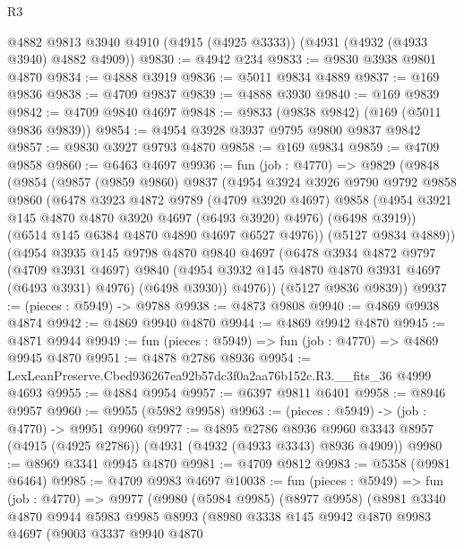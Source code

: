 \begin{lexlean}{R3}
\begin{coremodule}
    @4882
    @9813
    @3940
    @4910
    (@4915 (@4925 @3333))
    (@4931 (@4932 (@4933 @3940) @4882 @4909))
@9830 := @4942 @234
@9833 := @9830 @3938 @9801 @4870
@9834 := @4888 @3919
@9836 := @5011 @9834 @4889
@9837 := @169 @9836
@9838 := @4709 @9837
@9839 := @4888 @3930
@9840 := @169 @9839
@9842 := @4709 @9840 @4697
@9848 := @9833 (@9838 @9842) (@169 (@5011 @9836 @9839))
@9854 := @4954 @3928 @3937 @9795 @9800 @9837 @9842
@9857 := @9830 @3927 @9793 @4870
@9858 := @169 @9834
@9859 := @4709 @9858
@9860 := @6463 @4697
@9936 := fun (job : @4770) =>
  @9829
    (@9848
      (@9854
        (@9857
          (@9859 @9860)
          @9837
          (@4954
            @3924
            @3926
            @9790
            @9792
            @9858
            @9860
            (@6478
              @3923
              @4872
              @9789
              (@4709 @3920 @4697)
              @9858
              (@4954 @3921 @145 @4870 @4870 @3920 @4697 (@6493 @3920) @4976)
              (@6498 @3919))
            (@6514 @145 @6384 @4870 @4890 @4697 @6527 @4976))
          (@5127 @9834 @4889))
        (@4954
          @3935
          @145
          @9798
          @4870
          @9840
          @4697
          (@6478
            @3934
            @4872
            @9797
            (@4709 @3931 @4697)
            @9840
            (@4954 @3932 @145 @4870 @4870 @3931 @4697 (@6493 @3931) @4976)
            (@6498 @3930))
          @4976))
      (@5127 @9836 @9839))
@9937 := (pieces : @5949) -> @9788
@9938 := @4873 @9808
@9940 := @4869 @9938 @4874
@9942 := @4869 @9940 @4870
@9944 := @4869 @9942 @4870
@9945 := @4871 @9944
@9949 := fun (pieces : @5949) => fun (job : @4770) => @4869 @9945 @4870
@9951 := @4878 @2786 @8936
@9954 := LexLeanPreserve.Cbed936267ea92b57dc3f0a2aa76b152c.R3.__fits_36 @4999 @4693
@9955 := @4884 @9954
@9957 := @6397 @9811 @6401
@9958 := @8946 @9957
@9960 := @9955 (@5982 @9958)
@9963 := (pieces : @5949) -> (job : @4770) -> @9951 @9960
@9977 := @4895
    @2786
    @8936
    @9960
    @3343
    @8957
    (@4915 (@4925 @2786))
    (@4931 (@4932 (@4933 @3343) @8936 @4909))
@9980 := @8969 @3341 @9945 @4870
@9981 := @4709 @9812
@9983 := @5358 (@9981 @6464)
@9985 := @4709 @9983 @4697
@10038 := fun (pieces : @5949) =>
  fun (job : @4770) =>
  @9977
    (@9980
      (@5984 @9985)
      (@8977 @9958)
      (@8981
        @3340
        @4870
        @9944
        @5983
        @9985
        @8993
        (@8980
          @3338
          @145
          @9942
          @4870
          @9983
          @4697
          (@9003
            @3337
            @9940
            @4870

\end{coremodule}
\end{lexlean}

